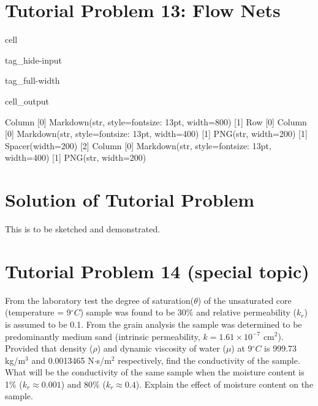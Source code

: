\documentclass[letterpaper,10pt,english]{jupyterBook}
\begin{document}
\section{Tutorial Problem 13: Flow Nets}
\label{\detokenize{content/tutorials/T5/tutorial_05:tutorial-problem-13-flow-nets}}
\begin{sphinxuseclass}{cell}
\begin{sphinxuseclass}{tag_hide-input}
\begin{sphinxuseclass}{tag_full-width}\begin{sphinxVerbatimOutput}

\begin{sphinxuseclass}{cell_output}
\begin{sphinxVerbatim}[commandchars=\\\{\}]
Column
    [0] Markdown(str, style=\PYGZob{}\PYGZsq{}font\PYGZhy{}size\PYGZsq{}: \PYGZsq{}13pt\PYGZsq{}\PYGZcb{}, width=800)
    [1] Row
        [0] Column
            [0] Markdown(str, style=\PYGZob{}\PYGZsq{}font\PYGZhy{}size\PYGZsq{}: \PYGZsq{}13pt\PYGZsq{}\PYGZcb{}, width=400)
            [1] PNG(str, width=200)
        [1] Spacer(width=200)
        [2] Column
            [0] Markdown(str, style=\PYGZob{}\PYGZsq{}font\PYGZhy{}size\PYGZsq{}: \PYGZsq{}13pt\PYGZsq{}\PYGZcb{}, width=400)
            [1] PNG(str, width=200)
\end{sphinxVerbatim}

\end{sphinxuseclass}\end{sphinxVerbatimOutput}

\end{sphinxuseclass}
\end{sphinxuseclass}
\end{sphinxuseclass}

\section{Solution of Tutorial Problem}
\label{\detokenize{content/tutorials/T5/tutorial_05:solution-of-tutorial-problem}}
\sphinxAtStartPar
This is to be sketched and demonstrated.


\section{Tutorial Problem 14 (special topic)}
\label{\detokenize{content/tutorials/T5/tutorial_05:tutorial-problem-14-special-topic}}
\sphinxAtStartPar
From the laboratory test the degree of saturation(\(\theta\)) of the unsaturated core (temperature = 9\(^\circ C\)) sample was
found to be 30\% and relative permeability (\(k_r\)) is assumed to be 0.1.  From the grain analysis the sample was determined to be predominantly
medium sand (intrinsic permeability, \(k = 1.61 \times 10^{-7}\) cm\(^2\)). Provided that density (\(\rho\)) and dynamic
viscosity of water (\(\mu\)) at 9\(^\circ C\) is 999.73 kg/m\(^3\) and 0.0013465 N\(\cdot\)s/m\(^2\) respectively, find the conductivity of the
sample. What will be the conductivity of the same sample when the moisture content is 1\% (\(k_r \approx 0.001\)) and 80\% (\(k_r \approx 0.4\)). Explain the effect of moisture content on the sample.
\end{document}
